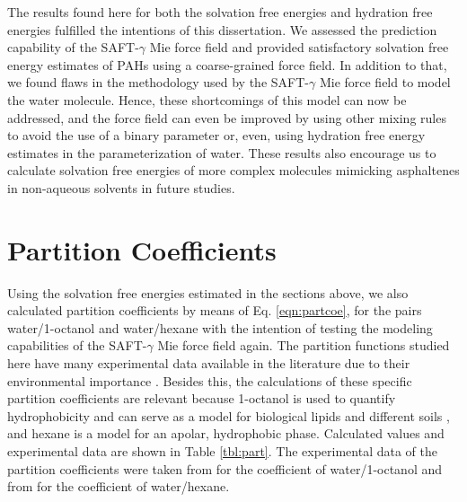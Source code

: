 The results found here for both the solvation free energies and hydration free energies fulfilled the intentions of this dissertation. We assessed the prediction capability of the SAFT-$\gamma$ Mie force field and provided satisfactory solvation free energy estimates of PAHs using a coarse-grained force field. In addition to that, we found flaws in the methodology used by the SAFT-$\gamma$ Mie force field to model the water molecule. Hence, these shortcomings of this model can now be addressed, and the force field can even be improved by using other mixing rules to avoid the use of a binary parameter or, even, using hydration free energy estimates in the parameterization of water. These results also encourage us to calculate solvation free energies of more complex molecules mimicking asphaltenes in non-aqueous solvents in future studies.  

\section{Partition Coefficients}

Using the solvation free energies estimated in the sections above, we also calculated partition coefficients by means of Eq. \eqref{eqn:partcoe}, for the pairs  water/1-octanol and water/hexane with the intention of testing the modeling capabilities of the SAFT-$\gamma$ Mie force field again. The partition functions studied here have many experimental data available in the literature due to their environmental importance \cite{sangster}. Besides this, the calculations of these specific partition coefficients are relevant because   1-octanol is used to quantify hydrophobicity and can serve as a model for biological lipids and different soils \cite{RUELLE2000457}, and hexane is a model for an apolar, hydrophobic phase. Calculated values and experimental data are shown in Table \ref{tbl:part}. The experimental data of the partition coefficients were taken from    for the coefficient of water/1-octanol and from  for the coefficient of water/hexane. 

